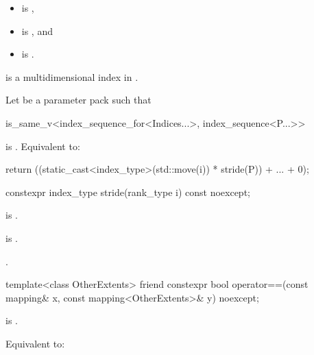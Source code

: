 \begin{itemdescr}
\pnum
\constraints
\begin{itemize}
\item
{} is ,
\item
{} is , and
\item
{} is .
\end{itemize}

\pnum
\expects
{} is
a multidimensional index in .

\pnum
\effects
Let  be a parameter pack such that
\begin{codeblock}
is_same_v<index_sequence_for<Indices...>, index_sequence<P...>>
\end{codeblock}
is .
Equivalent to:
\begin{codeblock}
return ((static_cast<index_type>(std::move(i)) * stride(P)) + ... + 0);
\end{codeblock}
\end{itemdescr}

%
\begin{itemdecl}
constexpr index_type stride(rank_type i) const noexcept;
\end{itemdecl}

\begin{itemdescr}
\pnum
\constraints
{} is .

\pnum
\expects
{} is .

\pnum
\returns
{}.
\end{itemdescr}

%
\begin{itemdecl}
template<class OtherExtents>
  friend constexpr bool operator==(const mapping& x, const mapping<OtherExtents>& y) noexcept;
\end{itemdecl}

\begin{itemdescr}
\pnum
\constraints
{} is .

\pnum
\effects
Equivalent to: 
\end{itemdescr}

